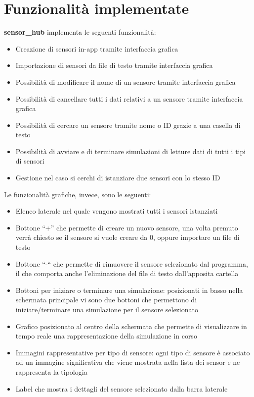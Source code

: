 \documentclass{article}
\begin{document}
\section{Funzionalità implementate}
\textbf{sensor\_hub} implementa le seguenti funzionalità:
\begin{itemize}
    \item Creazione di sensori in-app tramite interfaccia grafica
    \item Importazione di sensori da file di testo tramite interfaccia grafica
    \item Possibilità di modificare il nome di un sensore tramite interfaccia grafica
    \item Possibilità di cancellare tutti i dati relativi a un sensore tramite interfaccia grafica
    \item Possibilità di cercare un sensore tramite nome o ID grazie a una casella di testo
    \item Possibilità di avviare e di terminare simulazioni di letture dati di tutti i tipi di sensori
    \item Gestione nel caso si cerchi di istanziare due sensori con lo stesso ID
\end{itemize}
\newpage Le funzionalità grafiche, invece, sono le seguenti:
\begin{itemize}
    \item Elenco laterale nel quale vengono mostrati tutti i sensori istanziati
    \item Bottone “+” che permette di creare un nuovo sensore, una volta premuto verrà chiesto se il sensore si vuole creare da 0, oppure importare un file di testo
    \item Bottone “-“ che permette di rimuovere il sensore selezionato dal programma, il che comporta anche l’eliminazione del file di testo dall’apposita cartella 
    \item Bottoni per iniziare o terminare una simulazione: posizionati in basso nella schermata principale vi sono due bottoni che permettono di iniziare/terminare una simulazione per il sensore selezionato
    \item Grafico posizionato al centro della schermata che permette di visualizzare in tempo reale una rappresentazione della simulazione in corso
    \item Immagini rappresentative per tipo di sensore: ogni tipo di sensore è associato ad un immagine significativa che viene mostrata nella lista dei sensor e ne rappresenta la tipologia
    \item Label che mostra i dettagli del sensore selezionato dalla barra laterale 
\end{itemize}
\end{document}
